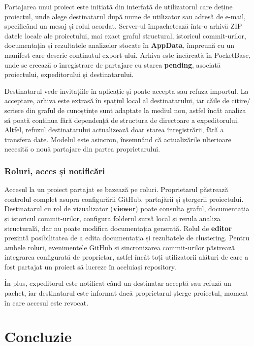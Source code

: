 \documentclass[12pt]{article}
\numberwithin{equation}{section}
\numberwithin{figure}{section}
\numberwithin{table}{section}
\theoremstyle{definition}
\theoremstyle{plain}
\begin{document}
Partajarea unui proiect este inițiată din interfață de utilizatorul care deține proiectul, unde alege destinatarul după nume de utilizator sau adresă de e-mail, specificând un mesaj și rolul acordat. Server-ul împachetează într-o arhivă ZIP datele locale ale proiectului, mai exact graful structural, istoricul commit-urilor, documentația și rezultatele analizelor stocate în \textbf{AppData}, împreună cu un manifest care descrie conținutul export-ului. Arhiva este încărcată în PocketBase, unde se creează o înregistrare de partajare cu starea \textbf{pending}, asociată proiectului, expeditorului și destinatarului.

Destinatarul vede invitațiile în aplicație și poate accepta sau refuza importul. La acceptare, arhiva este extrasă în spațiul local al destinatarului, iar căile de citire/ scriere din graful de cunoștințe sunt adaptate la mediul nou, astfel încât analiza să poată continua fără dependență de structura de directoare a expeditorului. Altfel, refuzul destinatarului actualizează doar starea înregistrării, fără a transfera date. Modelul este asincron, însemnând că actualizările ulterioare necesită o nouă partajare din partea proprietarului.

\subsubsection{Roluri, acces și notificări}

Accesul la un proiect partajat se bazează pe roluri. Proprietarul păstrează controlul complet asupra configurării GitHub, partajării și ștergerii proiectului. Destinatarul cu rol de vizualizator (\textbf{viewer}) poate consulta graful, documentația și istoricul commit-urilor, configura folderul sursă local și rerula analiza structurală, dar nu poate modifica documentația generată. Rolul de \textbf{editor} prezintă posibilitatea de a edita documentația și rezultatele de clustering. Pentru ambele roluri, evenimentele GitHub și sincronizarea commit-urilor păstrează integrarea configurată de proprietar, astfel încât toți utilizatorii alături de care a fost partajat un proiect să lucreze în aceluiași repository.

În plus, expeditorul este notificat când un destinatar acceptă sau refuză un pachet, iar destinatarul este informat dacă proprietarul șterge proiectul, moment în care accesul este revocat.

\section{Concluzie}
\end{document}
